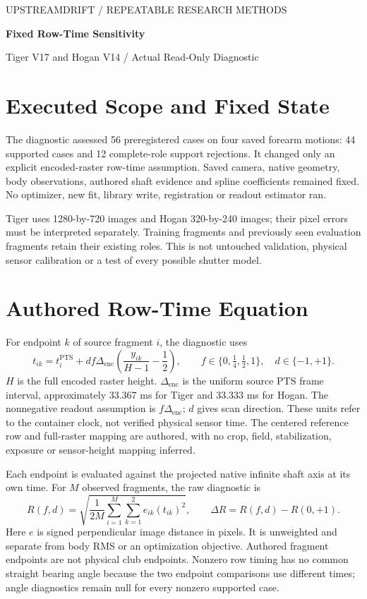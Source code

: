 \documentclass[11pt,letterpaper]{article}
\begin{document}
{\small\textcolor{accent}{UPSTREAMDRIFT / REPEATABLE RESEARCH METHODS}}\par
{\LARGE\bfseries\textcolor{ink}{Fixed Row-Time Sensitivity}}\par
{\large Tiger V17 and Hogan V14 / Actual Read-Only Diagnostic}\par
\section{Executed Scope and Fixed State}
The diagnostic assessed 56 preregistered cases on four saved forearm motions:
44 supported cases and 12 complete-role support rejections. It changed only an
explicit encoded-raster row-time assumption. Saved camera, native geometry,
body observations, authored shaft evidence and spline coefficients remained fixed.
No optimizer, new fit, library write, registration or readout estimator ran.

Tiger uses 1280-by-720 images and Hogan 320-by-240 images; their pixel errors must
be interpreted separately. Training fragments and previously seen evaluation
fragments retain their existing roles. This is not untouched validation, physical
sensor calibration or a test of every possible shutter model.

\section{Authored Row-Time Equation}
For endpoint $k$ of source fragment $i$, the diagnostic uses
\begin{equation}
t_{ik}=t_i^{\mathrm{PTS}}+d f\Delta_{\mathrm{enc}}
\left(\frac{y_{ik}}{H-1}-\frac12\right),
\qquad f\in\{0,\tfrac14,\tfrac12,1\},\quad d\in\{-1,+1\}.
\end{equation}
$H$ is the full encoded raster height. $\Delta_{\mathrm{enc}}$ is the uniform
source PTS frame interval, approximately 33.367 ms for Tiger and 33.333 ms for
Hogan. The nonnegative readout assumption is $f\Delta_{\mathrm{enc}}$; $d$ gives
scan direction. These units refer to the container clock, not verified physical
sensor time. The centered reference row and full-raster mapping are authored,
with no crop, field, stabilization, exposure or sensor-height mapping inferred.

Each endpoint is evaluated against the projected native infinite shaft axis at
its own time. For $M$ observed fragments, the raw diagnostic is
\begin{equation}
R(f,d)=\sqrt{\frac{1}{2M}\sum_{i=1}^{M}\sum_{k=1}^{2}e_{ik}(t_{ik})^2},
\qquad \Delta R=R(f,d)-R(0,+1).
\end{equation}
Here $e$ is signed perpendicular image distance in pixels. It is unweighted and
separate from body RMS or an optimization objective. Authored fragment endpoints
are not physical club endpoints. Nonzero row timing has no common straight
bearing angle because the two endpoint comparisons use different times; angle
diagnostics remain null for every nonzero supported case.
\end{document}
